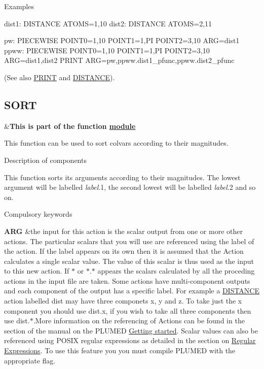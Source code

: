 \begin{DoxyParagraph}{Examples}
\begin{DoxyVerb}dist1: DISTANCE ATOMS=1,10
dist2: DISTANCE ATOMS=2,11

pw: PIECEWISE POINT0=1,10 POINT1=1,PI POINT2=3,10 ARG=dist1
ppww: PIECEWISE POINT0=1,10 POINT1=1,PI POINT2=3,10 ARG=dist1,dist2
PRINT ARG=pw,ppww.dist1_pfunc,ppww.dist2_pfunc
\end{DoxyVerb}
 (See also \hyperlink{PRINT}{P\+R\+I\+N\+T} and \hyperlink{DISTANCE}{D\+I\+S\+T\+A\+N\+C\+E}). 
\end{DoxyParagraph}
\hypertarget{SORT}{}\subsection{S\+O\+R\+T}\label{SORT}
\begin{TabularC}{2}
\hline
&{\bfseries  This is part of the function \hyperlink{mymodules}{module }}   \\
\end{TabularC}
This function can be used to sort colvars according to their magnitudes.

\begin{DoxyParagraph}{Description of components}

\end{DoxyParagraph}
This function sorts its arguments according to their magnitudes. The lowest argument will be labelled {\itshape label}.1, the second lowest will be labelled {\itshape label}.2 and so on.

\begin{DoxyParagraph}{Compulsory keywords}

\end{DoxyParagraph}
\begin{TabularC}{2}
\hline
{\bfseries  A\+R\+G } &the input for this action is the scalar output from one or more other actions. The particular scalars that you will use are referenced using the label of the action. If the label appears on its own then it is assumed that the Action calculates a single scalar value. The value of this scalar is thus used as the input to this new action. If $\ast$ or $\ast$.$\ast$ appears the scalars calculated by all the proceding actions in the input file are taken. Some actions have multi-\/component outputs and each component of the output has a specific label. For example a \hyperlink{DISTANCE}{D\+I\+S\+T\+A\+N\+C\+E} action labelled dist may have three componets x, y and z. To take just the x component you should use dist.\+x, if you wish to take all three components then use dist.$\ast$.More information on the referencing of Actions can be found in the section of the manual on the P\+L\+U\+M\+E\+D \hyperlink{_syntax}{Getting started}. Scalar values can also be referenced using P\+O\+S\+I\+X regular expressions as detailed in the section on \hyperlink{Regex}{Regular Expressions}. To use this feature you you must compile P\+L\+U\+M\+E\+D with the appropriate flag.   \\
\end{TabularC}


